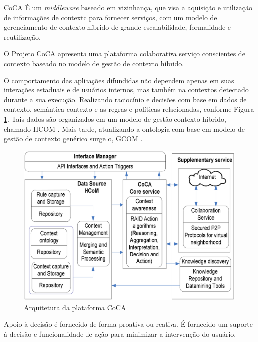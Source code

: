 \documentclass[12pt,a4paper,compsoc]{IEEEtran}
\begin{document}
  CoCA É um \textit{middleware} baseado em vizinhança, que visa a aquisição e utilização de
  informações de contexto para fornecer serviços, com um modelo de gerenciamento de contexto híbrido
  de grande escalabilidade, formalidade e reutilização.
  
  O Projeto CoCA \cite{ejigu2008hybrid} apresenta uma plataforma colaborativa serviço conscientes
  de contexto baseado no modelo de gestão de contexto híbrido.
  
  O comportamento das aplicações difundidas não dependem apenas em suas interações estaduais e de
  usuários internos, mas também na contextos detectado durante a sua execução. Realizando 
  raciocínio e decisões com base em dados de contexto, semântica contexto e as regras e políticas
  relacionadas, conforme Figura \ref{arquitetura-coca}. Tais dados são organizados em um modelo de
  gestão contexto híbrido, chamado HCOM \cite{ejigu2008hybrid}. Mais tarde, atualizando a ontologia
  com base em modelo de gestão de contexto genérico surge o, GCOM \cite{ejigu2008hybrid}.

  \begin{figure}[ht]
    \centerline{\includegraphics[scale=.2]{imagens/arquitetura-coca}}
    \caption{Arquitetura da plataforma CoCA \cite{ejigu2008hybrid}}
    \label{arquitetura-coca}
  \end{figure}
  
  Apoio à decisão é fornecido de forma proativa ou reativa. É fornecido um suporte à decisão e 
  funcionalidade de ação para minimizar a intervenção do usuário.
\end{document}
